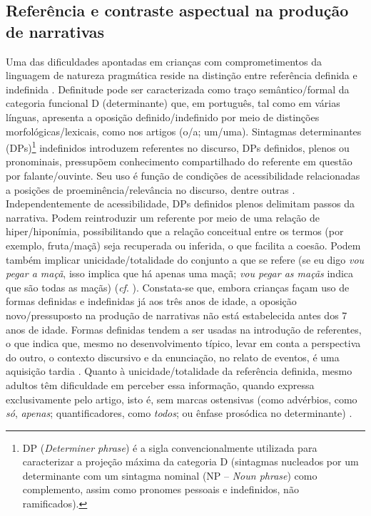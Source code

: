 \documentclass[output=paper,colorlinks,citecolor=brown,booklanguage=portuguese]{langscibook}
\begin{document}
\subsection{Referência e contraste aspectual na produção de narrativas }

Uma das dificuldades apontadas em crianças com comprometimentos da lingua\-gem de natureza pragmática reside na distinção entre referência definida e indefinida \citep{Bishop1989, Polite2011}. Definitude pode ser caracterizada como traço semântico/formal da categoria funcional D (determinante) que, em português, tal como em várias línguas, apresenta a oposição definido/indefinido por meio de distinções morfológicas/lexicais, como nos artigos (o/a; um/uma). Sintagmas determinantes (DPs)\footnote{ DP (\emph{Determiner phrase}) é a sigla convencionalmente utilizada para caracterizar a projeção máxima da categoria D (sintagmas nucleados por um determinante com um sintagma nominal (NP – \emph{Noun phrase}) como complemento, assim como pronomes pessoais e indefinidos, não ramificados).} indefinidos introduzem referentes no discurso, DPs definidos, plenos ou pronominais, pressupõem conhecimento compartilhado do referente em questão por falante/ouvinte. Seu uso é função de condições de acessibilidade relacionadas a posições de proeminência/relevância no discurso, dentre outras \citep{Ariel1991, Arnold2010}. Independentemente de acessibilidade, DPs definidos plenos delimitam passos da narrativa. Podem reintroduzir um referente por meio de uma relação de hiper/hiponímia, possibilitando que a relação conceitual entre os termos (por exemplo, fruta/maçã) seja recuperada ou inferida, o que facilita a coesão.  Podem também implicar unicidade/totalidade do conjunto a que se refere (se eu digo \emph{vou pegar a maçã}, isso implica que há apenas uma maçã; \emph{vou pegar as maçãs} indica que são todas as maçãs) (\emph{cf}. \citealp{Longchamps2014, Lyons1999}). Constata-se que, embora crianças façam uso de formas definidas e indefinidas já aos três anos de idade, a oposição novo/pressuposto na produção de narrativas não está estabelecida antes dos 7 anos de idade. Formas definidas tendem a ser usadas na introdução de referentes, o que indica que, mesmo no desenvolvimento típico, levar em conta a perspectiva do outro, o contexto discursivo e da enunciação, no relato de eventos, é uma aquisição tardia \citep{Hickmann1999, Hickmann1996, KarmiloffSmith1979}. Quanto à unicidade/totalidade da referência definida, mesmo adultos têm dificuldade em perceber essa informação, quando expressa exclusivamente pelo artigo, isto é, sem marcas ostensivas (como advérbios, como \emph{só}, \emph{apenas}; quantificadores, como \emph{todos}; ou ênfase prosódica no determinante) \citep{KarmiloffSmith1979, Longchamps2014, Longchamps2013}. 
\end{document}
